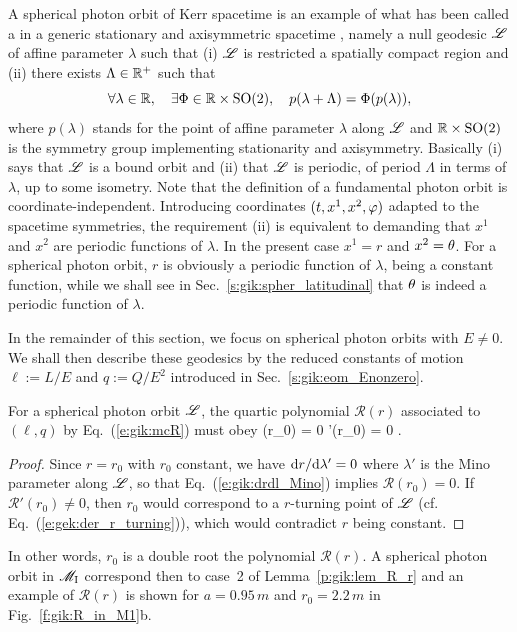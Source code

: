 \begin{remark}
A spherical photon orbit of Kerr spacetime is an example of what has been called
a  in a generic stationary and axisymmetric
spacetime \cite{CunhaH18,CunhaHR17}, namely a null geodesic $\mathscr{L}$ of affine
parameter $\lambda$ such
that (i) $\mathscr{L}$ is restricted a spatially compact region and (ii) there exists
$\Lambda\in\mathbb{R}^+$ such that
\[
    \forall \lambda\in\mathbb{R}, \quad \exists \Phi\in \mathbb{R}\times\mathrm{SO(2)},
    \quad p(\lambda + \Lambda) = \Phi(p(\lambda)) ,
\]
where $p(\lambda)$ stands for the point of affine parameter $\lambda$ along $\mathscr{L}$
and $\mathbb{R}\times\mathrm{SO(2)}$ is the symmetry group implementing
stationarity and axisymmetry. Basically (i) says that $\mathscr{L}$ is a bound orbit
and (ii) that $\mathscr{L}$ is periodic, of period $\Lambda$ in terms of $\lambda$,
up to some isometry. Note that the definition of a fundamental photon orbit
is coordinate-independent. Introducing coordinates $(t,x^1,x^2,\varphi)$ adapted
to the spacetime symmetries, the requirement (ii) is equivalent to
demanding that $x^1$ and $x^2$ are periodic functions of $\lambda$. In the
present case $x^1 = r$ and $x^2 = \theta$. For a spherical photon orbit, $r$
is obviously a periodic function of $\lambda$, being a constant function, while
we shall see in Sec.~\ref{s:gik:spher_latitudinal} that $\theta$ is indeed
a periodic function of $\lambda$.
\end{remark}

In the remainder of this section, we focus on spherical photon orbits with $E\neq 0$.
We shall then describe these geodesics by the reduced constants of motion $\ell := L/E$
and $q := Q/E^2$ introduced in Sec.~\ref{s:gik:eom_Enonzero}.

For a spherical photon orbit $\mathscr{L}$,
the quartic polynomial $\mathcal{R}(r)$ associated to $(\ell,q)$ by Eq.~(\ref{e:gik:mcR})
must obey
\be \label{e:gik:R_Rp_r0_zero}
    (r_0) = 0 \qand {}'(r_0) = 0 .
\ee
\begin{proof}
Since $r=r_0$ with $r_0$ constant, we have $\mathrm{d} r/\mathrm{d}\lambda' = 0$ where $\lambda'$ is the Mino parameter along $\mathscr{L}$, so
that Eq.~(\ref{e:gik:drdl_Mino}) implies $\mathcal{R}(r_0) = 0$. If $\mathcal{R}'(r_0) \neq 0$,
then $r_0$ would correspond to a $r$-turning point of $\mathscr{L}$  (cf. Eq.~(\ref{e:gek:der_r_turning})),
which would contradict $r$ being constant.
\end{proof}
In other words, $r_0$ is a double root the polynomial $\mathcal{R}(r)$. A spherical
photon orbit in $\mathscr{M}_{\rm I}$ correspond then to case~2 of Lemma~\ref{p:gik:lem_R_r}
and an example of $\mathcal{R}(r)$ is shown
for $a=0.95\, m$ and $r_0=2.2\, m$ in Fig.~\ref{f:gik:R_in_M1}b.

